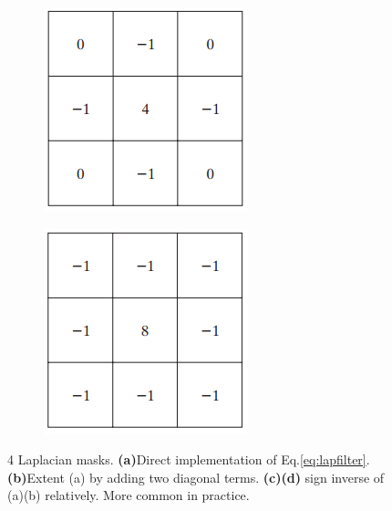 \begin{figure}[h!]
\begin{subfigure}[b]{0.2\linewidth}
		\caption{}
		\label{fig:lap2}
  	\end{subfigure}
  	\begin{subfigure}[b]{0.2\linewidth}
		\includegraphics[width=\linewidth]{myfigure/p2/lap-3.png}
		\caption{}
		\label{fig:lap3}
	\end{subfigure}
	\begin{subfigure}[b]{0.2\linewidth}
    	\includegraphics[width=\linewidth]{myfigure/p2/lap-4.png}
		\caption{}
		\label{fig:lap4}
  	\end{subfigure}
  	\caption{4 Laplacian masks. \textbf{(a)}Direct implementation of Eq.\ref{eq:lapfilter}. \textbf{(b)}Extent (a) by adding two diagonal terms. \textbf{(c)(d)} sign inverse of (a)(b) relatively. More common in practice.}
  	\label{fig:lapfilter}
\end{figure}

